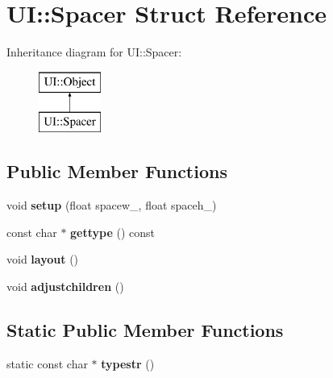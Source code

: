 \hypertarget{struct_u_i_1_1_spacer}{}\section{UI\+:\+:Spacer Struct Reference}
\label{struct_u_i_1_1_spacer}
Inheritance diagram for UI\+:\+:Spacer\+:\begin{figure}[H]
\begin{center}
\leavevmode
\includegraphics[height=2.000000cm]{struct_u_i_1_1_spacer}
\end{center}
\end{figure}
\subsection*{Public Member Functions}
\begin{DoxyCompactItemize}
\item 
\mbox{\label{struct_u_i_1_1_spacer_aeddee58769e663bcba0b4f29a0409143}} 
void {\bfseries setup} (float spacew\+\_\+, float spaceh\+\_\+)
\item 
\mbox{\label{struct_u_i_1_1_spacer_a7b481a3bc315ac44282da28e22507411}} 
const char $\ast$ {\bfseries gettype} () const
\item 
\mbox{\label{struct_u_i_1_1_spacer_acf5b563865b5ce8dd513d9714ec391c2}} 
void {\bfseries layout} ()
\item 
\mbox{\label{struct_u_i_1_1_spacer_a7fc1891bc523b71604b5a09c0bcc303f}} 
void {\bfseries adjustchildren} ()
\end{DoxyCompactItemize}
\subsection*{Static Public Member Functions}
\begin{DoxyCompactItemize}
\item 
\mbox{\label{struct_u_i_1_1_spacer_a1ebbab3505b36a28ffe90010e2d4f2eb}} 
static const char $\ast$ {\bfseries typestr} ()
\end{DoxyCompactItemize}
